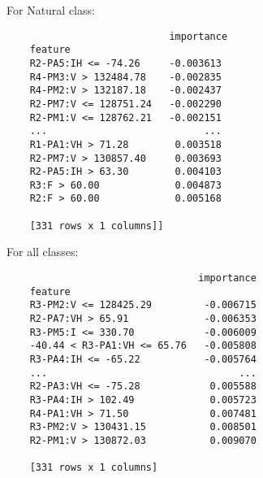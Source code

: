 For Natural class: 
\begin{verbatim}
                            importance
    feature                          
    R2-PA5:IH <= -74.26     -0.003613
    R4-PM3:V > 132484.78    -0.002835
    R4-PM2:V > 132187.18    -0.002437
    R2-PM7:V <= 128751.24   -0.002290
    R2-PM1:V <= 128762.21   -0.002151
    ...                           ...
    R1-PA1:VH > 71.28        0.003518
    R2-PM7:V > 130857.40     0.003693
    R2-PA5:IH > 63.30        0.004103
    R3:F > 60.00             0.004873
    R2:F > 60.00             0.005168
    
    [331 rows x 1 columns]]
\end{verbatim}

For all classes:
\begin{verbatim}
                                 importance
    feature                                
    R3-PM2:V <= 128425.29         -0.006715
    R2-PA7:VH > 65.91             -0.006353
    R3-PM5:I <= 330.70            -0.006009
    -40.44 < R3-PA1:VH <= 65.76   -0.005808
    R3-PA4:IH <= -65.22           -0.005764
    ...                                 ...
    R2-PA3:VH <= -75.28            0.005588
    R3-PA4:IH > 102.49             0.005723
    R4-PA1:VH > 71.50              0.007481
    R3-PM2:V > 130431.15           0.008501
    R2-PM1:V > 130872.03           0.009070
    
    [331 rows x 1 columns]
\end{verbatim}